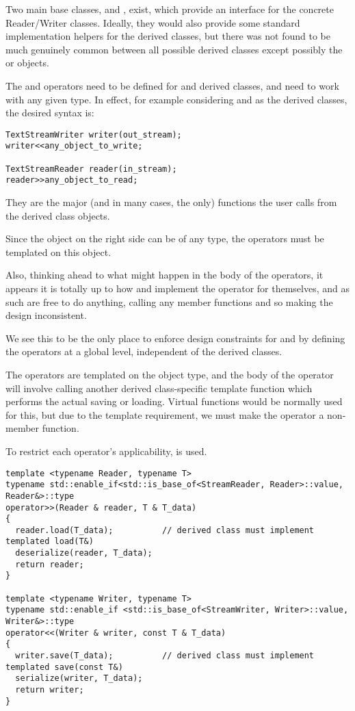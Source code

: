\documentclass{article}
\begin{document}
Two main base classes,  and ,
exist, which provide an interface for the concrete Reader/Writer
classes. Ideally, they would also provide some standard implementation
helpers for the derived classes, but there was not found to be much
genuinely common between all possible derived classes except possibly
the  or  objects.

The \code{<<} and \code{>>} operators need to be defined for
 and  derived classes, and need
to work with any given type. In effect, for example considering
 and  as the derived
classes, the desired syntax is:

\begin{lstlisting}
TextStreamWriter writer(out_stream);
writer<<any_object_to_write;

TextStreamReader reader(in_stream);
reader>>any_object_to_read;
\end{lstlisting}

They are the major (and in many cases, the only) functions the user
calls from the derived class objects.


Since the object on the right side can be of any type, the operators
must be templated on this object.  

Also, thinking ahead to what might happen in the body of the
operators, it appears it is totally up to how 
and  implement the operator for themselves, and
as such are free to do anything, calling any member functions and so
making the design inconsistent.

We see this to be the only place to enforce design constraints for
 and  by defining the
operators at a global level, independent of the derived classes.

The operators are templated on the object type, and the body of the
operator will involve calling another derived class-specific template
function which performs the actual saving or loading. Virtual
functions would be normally used for this, but due to the template
requirement, we must make the operator a non-member function.

To restrict each operator's applicability,  is
used.

\begin{lstlisting}
template <typename Reader, typename T>
typename std::enable_if<std::is_base_of<StreamReader, Reader>::value, Reader&>::type
operator>>(Reader & reader, T & T_data)
{
  reader.load(T_data);          // derived class must implement templated load(T&)
  deserialize(reader, T_data);
  return reader;
}

template <typename Writer, typename T>
typename std::enable_if <std::is_base_of<StreamWriter, Writer>::value, Writer&>::type
operator<<(Writer & writer, const T & T_data)
{
  writer.save(T_data);          // derived class must implement templated save(const T&)
  serialize(writer, T_data);
  return writer;
}
\end{lstlisting}
\end{document}
